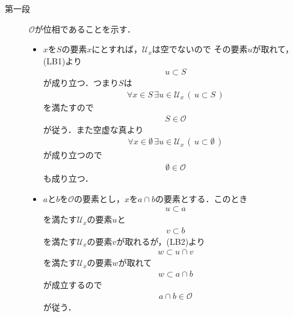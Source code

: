 	\begin{prf}\mbox{}
		\begin{description}
			\item[第一段]
				$\mathscr{O}$が位相であることを示す．
				\begin{itemize}
					\item $x$を$S$の要素$x$にとすれば，$\mathcal{U}_{x}$は空でないので
						その要素$u$が取れて，(LB1)より
						\begin{align}
							u \subset S
						\end{align}
						が成り立つ．つまり$S$は
						\begin{align}
							\forall x \in S\, \exists u \in \mathcal{U}_{x}\, (\, u \subset S\, )
						\end{align}
						を満たすので
						\begin{align}
							S \in \mathscr{O}
						\end{align}
						が従う．また空虚な真より
						\begin{align}
							\forall x \in \emptyset\, \exists u \in \mathcal{U}_{x}\, (\, u \subset \emptyset\, )
						\end{align}
						が成り立つので
						\begin{align}
							\emptyset \in \mathscr{O}
						\end{align}
						も成り立つ．
						
					\item $a$と$b$を$\mathscr{O}$の要素とし，$x$を$a \cap b$の要素とする．このとき
						\begin{align}
							u \subset a
						\end{align}
						を満たす$\mathcal{U}_{x}$の要素$u$と
						\begin{align}
							v \subset b
						\end{align}
						を満たす$\mathcal{U}_{x}$の要素$v$が取れるが，(LB2)より
						\begin{align}
							w \subset u \cap v
						\end{align}
						を満たす$\mathcal{U}_{x}$の要素$w$が取れて
						\begin{align}
							w \subset a \cap b
						\end{align}
						が成立するので
						\begin{align}
							a \cap b \in \mathscr{O}
						\end{align}
						が従う．
						

\end{itemize}
\end{description}
\end{prf}
